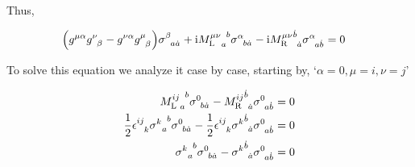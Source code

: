 Thus,

\begin{align}
    \qty(g^{\mu\alpha}\tensor{g}{^\nu_\beta}- g^{\nu\alpha}\tensor{g}{^\mu_\beta})\tensor{\sigma}{^\beta_a_{\dot a}}+\im\tensor{{{M_{\textnormal L}^{\mu\nu}}}}{_a^b}\tensor{\sigma}{^\alpha_b_{\dot a}}-\im\tensor{{{M_{\textnormal R}^{\mu\nu}}}}{^{\dot b}_{\dot a}}\tensor{\sigma}{^\alpha_a_{\dot b}}&=0\nonumber
\end{align}

To solve this equation we analyze it case by case, starting by, `$\alpha=0,\mu=i,\nu=j$'

\begin{align}
    \tensor{{{M_{\textnormal L}^{ij}}}}{_a^b}\tensor{\sigma}{^0_b_{\dot a}}-\tensor{{{M_{\textnormal R}^{ij}}}}{^{\dot b}_{\dot a}}\tensor{\sigma}{^0_a_{\dot b}}&=0\nonumber\\
    \frac12\tensor{\epsilon}{^i^j_k}\tensor{{\sigma^k}}{_a^b}\tensor{\sigma}{^0_b_{\dot a}}-\frac12\tensor{\epsilon}{^i^j_k}\tensor{{{\sigma^k}}}{^{\dot b}_{\dot a}}\tensor{\sigma}{^0_a_{\dot b}}&=0\nonumber\\
    \tensor{{\sigma^k}}{_a^b}\tensor{\sigma}{^0_b_{\dot a}}-\tensor{{{\sigma^k}}}{^{\dot b}_{\dot a}}\tensor{\sigma}{^0_a_{\dot b}}&=0\nonumber
\end{align}





